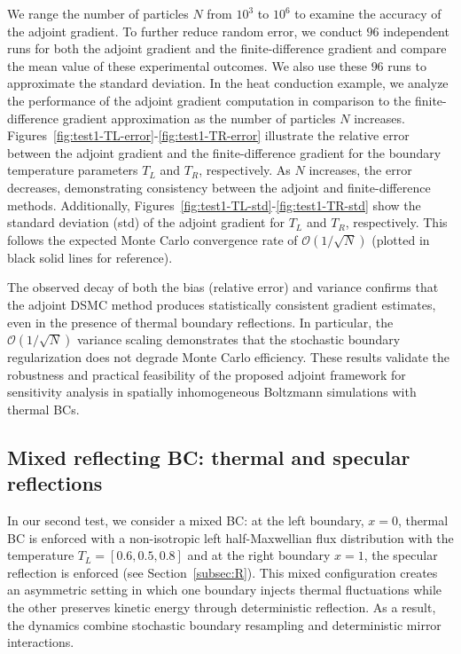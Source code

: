 \documentclass[12pt,nopreprintline]{elsarticle}
\begin{document}
We range the number of particles $N$ from $10^{3}$ to $10^6$ to examine the accuracy of the adjoint gradient. To further reduce random error, we conduct $96$ independent runs for both the adjoint gradient and the finite-difference gradient and compare the mean value of these experimental outcomes. We also use these $96$ runs to approximate the standard deviation. In the heat conduction example, we analyze the performance of the adjoint gradient computation in comparison to the finite-difference gradient approximation as the number of particles $N$ increases. Figures~\ref{fig:test1-TL-error}-\ref{fig:test1-TR-error} illustrate the relative error between the adjoint gradient and the finite-difference gradient for the boundary temperature parameters $T_L$ and $T_R$, respectively. As $N$ increases, the error decreases, demonstrating consistency between the adjoint and finite-difference methods. Additionally, Figures~\ref{fig:test1-TL-std}-\ref{fig:test1-TR-std} show the standard deviation (std) of the adjoint gradient for $T_L$ and $T_R$, respectively. This follows the expected Monte Carlo convergence rate of $\mathcal{O}(1/\sqrt{N})$ (plotted in black solid lines for reference). %

The observed decay of both the bias (relative error) and variance confirms that the adjoint DSMC method produces statistically consistent gradient estimates, even in the presence of thermal boundary reflections. In particular, the $\mathcal{O}(1/\sqrt{N})$ variance scaling demonstrates that the stochastic boundary regularization does not degrade Monte Carlo efficiency. These results validate the robustness and practical feasibility of the proposed adjoint framework for sensitivity analysis in spatially inhomogeneous Boltzmann simulations with thermal BCs.


\subsection{Mixed reflecting BC: thermal and specular reflections}\label{subsec:test2}
In our second test, we consider a mixed BC: at the left boundary, $x=0$,  thermal BC is enforced with a non-isotropic left half-Maxwellian flux distribution with the temperature $T_L  =  [0.6,0.5,0.8]$ and at the right boundary $x=1$, the specular reflection is enforced (see Section~\ref{subsec:R}). This mixed configuration creates an asymmetric setting in which one boundary injects thermal fluctuations while the other preserves kinetic energy through deterministic reflection. As a result, the dynamics combine stochastic boundary resampling and deterministic mirror interactions.
\end{document}
